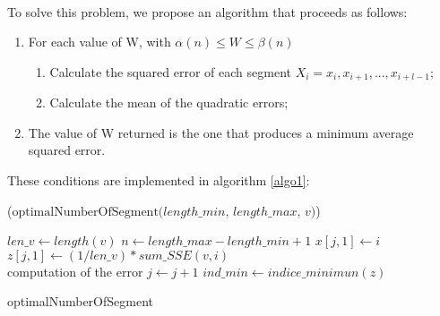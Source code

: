 \paragraph{} To solve this problem, we
propose an algorithm that proceeds as follows:
\begin{enumerate}
\item For each value of W, with $ \alpha(n) \leq W \leq \beta(n) $
\begin{enumerate}
\item Calculate the squared error of each segment
$ X_{i} = x_{i}, x_{i + 1}, ..., x_{i + l-1}; $
\item Calculate the mean of the quadratic errors;
\end{enumerate}
\item The value of W returned is the one that produces a minimum average squared error. 
\end{enumerate}

These conditions are implemented in algorithm \ref{algo1}:

\begin{algorithm}[h]
\DontPrintSemicolon
{}

\Begin($\text{optimalNumberOfSegment} {(} length\_min, \, length\_max, \, v{)}$)
{
  $len\_v \leftarrow length(v)$\;
  $n \leftarrow length\_max - length\_min + 1$\;
  {
    $x[j, 1] \leftarrow i$\;
    $z[j, 1] \leftarrow  (1/len\_v) * sum\_SSE(v, i)$\; \\computation of the error    
		$j \leftarrow j + 1$\;
  }
	$ind\_min \leftarrow indice\_minimun(z)$\;

}
\caption{optimalNumberOfSegment}
\label{algo1}
\end{algorithm}




